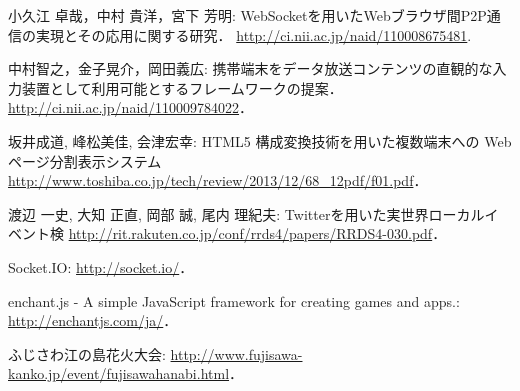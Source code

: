 \begin{thebibliography}{1}
        小久江 卓哉，中村 貴洋，宮下 芳明:
        WebSocketを用いたWebブラウザ間P2P通信の実現とその応用に関する研究．
        \url{http://ci.nii.ac.jp/naid/110008675481}.

        中村智之，金子晃介，岡田義広:
        携帯端末をデータ放送コンテンツの直観的な入力装置として利用可能とするフレームワークの提案．
        \url{http://ci.nii.ac.jp/naid/110009784022}．

        坂井成道, 峰松美佳, 会津宏幸:
        HTML5 構成変換技術を用いた複数端末への Web ページ分割表示システム
        \url{http://www.toshiba.co.jp/tech/review/2013/12/68_12pdf/f01.pdf}．

        渡辺 一史, 大知 正直, 岡部 誠, 尾内 理紀夫:
        Twitterを用いた実世界ローカルイベント検
        \url{http://rit.rakuten.co.jp/conf/rrds4/papers/RRDS4-030.pdf}．

        Socket.IO:
        \url{http://socket.io/}．

        enchant.js - A simple JavaScript framework for creating games and apps.:
        \url{http://enchantjs.com/ja/}．

        ふじさわ江の島花火大会:
        \url{http://www.fujisawa-kanko.jp/event/fujisawahanabi.html}．

\end{thebibliography}

